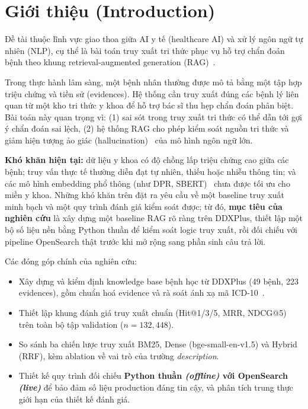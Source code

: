 
\section{Giới thiệu (Introduction)}
\label{sec:gioithieu}

Đề tài thuộc lĩnh vực giao thoa giữa AI y tế (healthcare AI) và xử lý ngôn ngữ tự nhiên (NLP), cụ thể là bài toán truy xuất tri thức phục vụ hỗ trợ chẩn đoán bệnh theo khung retrieval-augmented generation (RAG)~\cite{lewis2020rag}.

Trong thực hành lâm sàng, một bệnh nhân thường được mô tả bằng một tập hợp triệu chứng và tiền sử (evidences). Hệ thống cần truy xuất đúng các bệnh lý liên quan từ một kho tri thức y khoa để hỗ trợ bác sĩ thu hẹp chẩn đoán phân biệt. Bài toán này quan trọng vì: (1) sai sót trong truy xuất tri thức có thể dẫn tới gợi ý chẩn đoán sai lệch, (2) hệ thống RAG cho phép kiểm soát nguồn tri thức và giảm hiện tượng ảo giác (hallucination)~\cite{ji2023hallucination} của mô hình ngôn ngữ lớn.

\textbf{Khó khăn hiện tại:} dữ liệu y khoa có độ chồng lấp triệu chứng cao giữa các bệnh; truy vấn thực tế thường diễn đạt tự nhiên, thiếu hoặc nhiễu thông tin; và các mô hình embedding phổ thông (như DPR, SBERT)~\cite{karpukhin2020dpr,reimers2019sbert} chưa được tối ưu cho miền y khoa. Những khó khăn trên đặt ra yêu cầu về một baseline truy xuất minh bạch và một quy trình đánh giá kiểm soát được; từ đó, \textbf{mục tiêu của nghiên cứu} là xây dựng một baseline RAG rõ ràng trên DDXPlus, thiết lập một bộ số liệu nền bằng Python thuần để kiểm soát logic truy xuất, rồi đối chiếu với pipeline OpenSearch thật trước khi mở rộng sang phần sinh câu trả lời.

Các đóng góp chính của nghiên cứu:
\begin{itemize}
    \item Xây dựng và kiểm định knowledge base bệnh học từ DDXPlus (49 bệnh, 223 evidences), gồm chuẩn hoá evidence và rà soát ánh xạ mã ICD-10~\cite{who2019icd10}.
    \item Thiết lập khung đánh giá truy xuất chuẩn (Hit@1/3/5, MRR, NDCG@5) trên toàn bộ tập validation ($n=132{,}448$).
    \item So sánh ba chiến lược truy xuất BM25, Dense (bge-small-en-v1.5) và Hybrid (RRF), kèm ablation về vai trò của trường \textit{description}.
    \item Thiết kế quy trình đối chiếu \textbf{Python thuần \textit{(offline)} với OpenSearch \textit{(live)}} để bảo đảm số liệu production đáng tin cậy, và phân tích trung thực giới hạn của thiết kế đánh giá.
\end{itemize}
